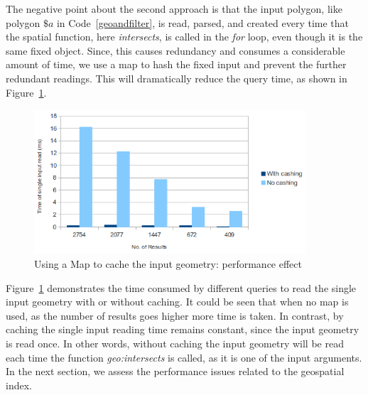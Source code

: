 \documentclass[a4paper,12pt]{article}
\begin{document}
The negative point about the second approach is that the input polygon, like polygon $\$a$ in Code~\ref{geoandfilter}, is read, parsed, and created every time that the spatial function, here \textit{intersects}, is called in the \textit{for} loop, even though it is the same fixed object. Since, this causes redundancy and consumes a considerable amount of time, we use a map to hash the fixed input and prevent the further redundant readings. This will dramatically reduce the query time, as shown in Figure~\ref{figMap}.
 \begin{figure}
\centering
\includegraphics[width=0.9\textwidth]{MapIndexing}
\caption{Using a Map to cache the input geometry: performance effect}
\label{figMap}
\end{figure}

Figure~\ref{figMap} demonstrates the time consumed by different queries to read the single input geometry with or without caching. It could be seen that when no map is used, as the number of results goes higher more time is taken. In contrast, by caching the single input reading time remains constant, since the input geometry is read once. In other words, without caching the input geometry will be read each time the function \textit{geo:intersects} is called, as it is one of the input arguments. In the next section, we assess the performance issues related to the geospatial index.
\end{document}
